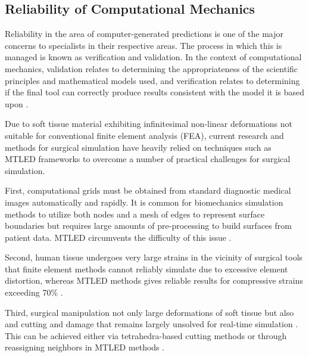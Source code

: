 \subsection{Reliability of Computational Mechanics}

Reliability in the area of computer-generated predictions is one of the major concerns to specialists in their respective areas. The process in which this is managed is known as verification and validation. In the context of computational mechanics, validation relates to determining the appropriateness of the scientific principles and mathematical models used, and verification relates to determining if the final tool can correctly produce results consistent with the model it is based upon \cite{TinsleyOden2003}.

Due to soft tissue material exhibiting infinitesimal non-linear deformations not suitable for conventional finite element analysis (FEA), \cite{Wittek2007} current research and methods for surgical simulation have heavily relied on techniques such as MTLED frameworks to overcome a number of practical challenges for surgical simulation.

First, computational grids must be obtained from standard diagnostic medical images automatically and rapidly. It is common for biomechanics simulation methods to utilize both nodes and a mesh of edges to represent surface boundaries but requires large amounts of pre-processing to build surfaces from patient data. MTLED circumvents the difficulty of this issue \cite{Joldes2019}.

Second, human tissue undergoes very large strains in the vicinity of surgical tools that finite element methods cannot reliably simulate due to excessive element distortion, whereas MTLED methods gives reliable results for compressive strains exceeding 70\% \cite{Joldes2019}.

Third, surgical manipulation not only large deformations of soft tissue but also and cutting and damage that remains largely unsolved for real-time simulation \cite{Joldes2019}. This can be achieved either via tetrahedra-based cutting methods \cite{10.1007/978-1-4419-9619-0_7} or through reassigning neighbors in MTLED methods \cite{Joldes2019}.

